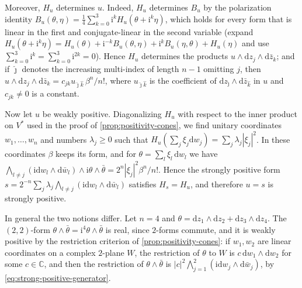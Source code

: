 Moreover, $H_u$ determines $u$. Indeed, $H_u$ determines $B_u$ by the polarization identity $B_u(\theta,\eta)=\frac14\sum_{k=0}^3\mathrm i^kH_u(\theta+\mathrm i^k\eta)$, which holds for every form that is linear in the first and conjugate-linear in the second variable (expand $H_u(\theta+\mathrm i^k\eta)=H_u(\theta)+\mathrm i^{-k}B_u(\theta,\eta)+\mathrm i^kB_u(\eta,\theta)+H_u(\eta)$ and use $\sum_{k=0}^3\mathrm i^k=\sum_{k=0}^3\mathrm i^{2k}=0$). Hence $H_u$ determines the products $u\wedge\mathrm dz_j\wedge\mathrm d\bar z_k$; and if $\hat\jmath$ denotes the increasing multi-index of length $n-1$ omitting $j$, then $u\wedge\mathrm dz_j\wedge\mathrm d\bar z_k=c_{jk}u_{\hat\jmath\hat k}\,\beta^n/n!$, where $u_{\hat\jmath\hat k}$ is the coefficient of $\mathrm dz_{\hat\jmath}\wedge\mathrm d\bar z_{\hat k}$ in $u$ and $c_{jk}\neq0$ is a constant.

Now let $u$ be weakly positive. Diagonalizing $H_u$ with respect to the inner product on $V^*$ used in the proof of \cref{prop:positivity-cones}, we find unitary coordinates $w_1,\ldots,w_n$ and numbers $\lambda_j\geq0$ such that $H_u(\sum_j\xi_j\mathrm dw_j)=\sum_j\lambda_j|\xi_j|^2$. In these coordinates $\beta$ keeps its form, and for $\theta=\sum_l\xi_l\,\mathrm dw_l$ we have $\bigwedge_{l\neq j}(\mathrm i\mathrm dw_l\wedge\mathrm d\bar w_l)\wedge\mathrm i\theta\wedge\bar\theta=2^n|\xi_j|^2\beta^n/n!$. Hence the strongly positive form $s=2^{-n}\sum_j\lambda_j\bigwedge_{l\neq j}(\mathrm i\mathrm dw_l\wedge\mathrm d\bar w_l)$ satisfies $H_s=H_u$, and therefore $u=s$ is strongly positive.

In general the two notions differ. Let $n=4$ and $\theta=\mathrm{d}z_1\wedge\mathrm{d}z_2+\mathrm{d}z_3\wedge\mathrm{d}z_4$. The $(2,2)$-form $\theta\wedge\bar\theta=\mathrm i^4\theta\wedge\bar\theta$ is real, since $2$-forms commute, and it is weakly positive by the restriction criterion of \cref{prop:positivity-cones}: if $w_1,w_2$ are linear coordinates on a complex $2$-plane $W$, the restriction of $\theta$ to $W$ is $c\,\mathrm dw_1\wedge\mathrm dw_2$ for some $c\in\mathbb C$, and then the restriction of $\theta\wedge\bar\theta$ is $|c|^2\bigwedge_{j=1}^2(\mathrm i\mathrm dw_j\wedge\mathrm d\bar w_j)$, by \eqref{eq:strong-positive-generator}.

